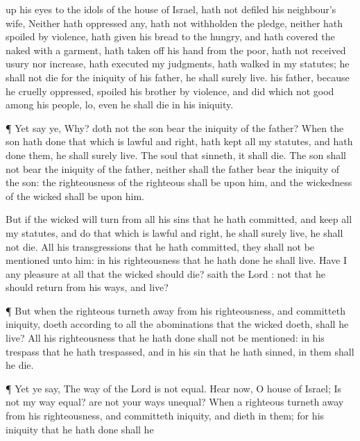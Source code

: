 {up his
eyes to the
idols of the
house of
Israel, hath not
defiled his
neighbour’s
wife,
Neither hath
oppressed
any, hath not
withholden the
pledge, neither hath
spoiled by
violence,
{} hath
given his
bread to the
hungry, and hath
covered the
naked with a
garment,
 hath taken
off his
hand from the
poor,
{} hath not
received
usury nor
increase, hath
executed my
judgments, hath
walked in my
statutes; he shall not
die for the
iniquity of his
father, he shall
surely
live.
 his
father, because he
cruelly
oppressed,
spoiled his
brother by
violence, and
did
{} which
{} not
good
among his
people, lo, even he shall
die in his
iniquity.
\par }{\PP {}¶ Yet
say ye, Why? doth not the
son
bear the
iniquity of the
father? When the
son hath
done that which is
lawful and
right,
{} hath
kept all my
statutes, and hath
done them, he shall
surely
live.
The
soul that
sinneth, it shall
die. The
son shall not
bear the
iniquity of the
father, neither shall the
father
bear the
iniquity of the
son: the
righteousness of the
righteous shall be upon him, and the
wickedness of the
wicked shall be upon him.
\par }{\PP {}But if the
wicked will
turn from all his
sins that he hath
committed, and
keep all my
statutes, and
do that which is
lawful and
right, he shall
surely
live, he shall not
die.
All his
transgressions that he hath
committed, they shall not be
mentioned unto him: in his
righteousness that he hath
done he shall
live.
Have I any
pleasure at
all that the
wicked should
die?
saith the
Lord
{}:
{} not that he should
return from his
ways, and
live?
\par }{\PP {}¶ But when the
righteous turneth
away from his
righteousness, and
committeth
iniquity,
{}
doeth according to all the
abominations that the
wicked
{}
doeth, shall he
live? All his
righteousness that he hath
done shall not be
mentioned: in his
trespass that he hath
trespassed, and in his
sin that he hath
sinned, in them shall he
die.
\par }{\PP {}¶ Yet ye
say, The
way of the
Lord is not
equal.
Hear now, O
house of
Israel; Is not my
way
equal? are not your
ways
unequal?
When a
righteous
{} turneth
away from his
righteousness, and
committeth
iniquity, and
dieth in them; for his
iniquity that he hath
done shall he
}
